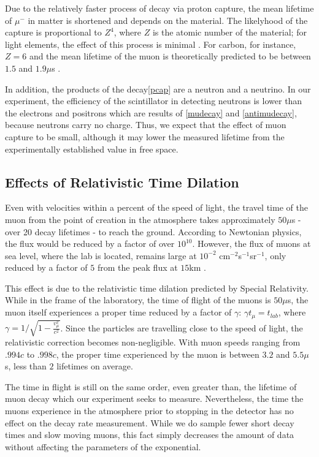 Due to the relatively faster process of decay via proton capture, the
mean lifetime of $\mu^-$ in matter is shortened and depends on the
material. The likelyhood of the capture is proportional to $Z^4$,
where $Z$ is the atomic number of the material; for light elements,
the effect of this process is minimal \cite[p.172]{rossi}. For carbon,
for instance, $Z=6$ and the mean lifetime of the muon is theoretically
predicted to be between $1.5$ and $1.9\mu$s \cite[p.~170]{rossi}. 

In addition, the products of the decay\eqref{pcap} are a neutron and a
neutrino. In our experiment, the efficiency of the scintillator in
detecting neutrons is lower than the electrons and positrons which are
results of \eqref{mudecay} and \eqref{antimudecay}, because neutrons
carry no charge. Thus, we expect that the effect of muon capture to be
small, although it may lower the measured lifetime from the
experimentally established value in free space.

\subsection{Effects of Relativistic Time Dilation}

Even with velocities within a percent of the speed of light, the
travel time of the muon from the point of creation in the atmosphere
takes approximately $50\mu$s - over 20 decay lifetimes - to reach the
ground. According to Newtonian physics, the flux would be reduced by a
factor of over $10^{10}$. However, the flux of muons at sea level,
where the lab is located, remains large at $10^{-2}$
cm$^{-2}$s$^{-1}$sr$^{-1}$, only reduced by a factor of $5$ from the peak
flux at $15$km \cite{rossi}.

This effect is due to the relativistic time dilation predicted by
Special Relativity. While in the frame of the laboratory, the time of
flight of the muons is $50\mu$s, the muon itself experiences a proper
time reduced by a factor of $\gamma$: $ \gamma t_{\mu} = t_{lab}$,
where $\gamma = 1/\sqrt{1 - \frac{v_{\mu}^2}{c^2}}$. Since the particles are
travelling close to the speed of light, the relativistic correction
becomes non-negligible. With muon speeds ranging from $.994c$ to
$.998c$, the proper time experienced by the muon is between $3.2$ and
$5.5\mu$s, less than $2$ lifetimes on average. 

The time in flight is still on the same order, even greater than, the
lifetime of muon decay which our experiment seeks to
measure. Nevertheless, the time the muons experience in the atmosphere
prior to stopping in the detector has no effect on the decay rate
measurement. While we do sample fewer short decay times and slow
moving muons, this fact simply decreases the amount of data without
affecting the parameters of the exponential.

